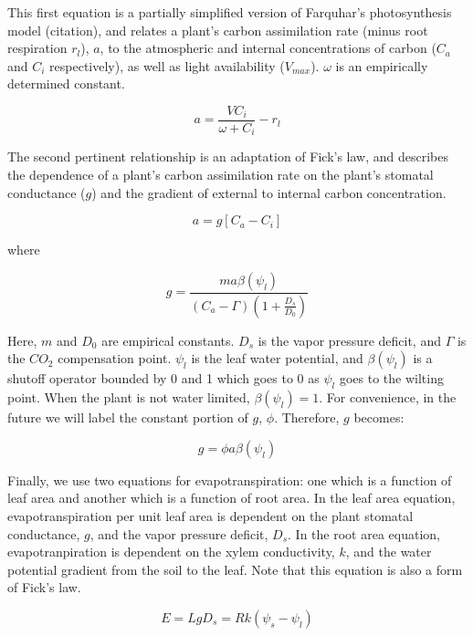 \documentclass{article}
\begin{document}
  This first equation is a partially simplified version of Farquhar's photosynthesis model
  (citation), and relates a plant's carbon assimilation rate (minus root respiration $r_{l}$), $a$, to the atmospheric and internal concentrations of
  carbon ($C_{a}$ and $C_{i}$ respectively), as well as light availability
  ($V_{max}$). $\omega$ is an empirically determined constant.


  \begin{equation} \label{eq:Farquhar}
    a = \frac{VC_{i}}{\omega + C_{i}} - r_{l}
  \end{equation}

  The second pertinent relationship is an adaptation of Fick's law, and
  describes the dependence of a plant's carbon assimilation rate on the
  plant's stomatal conductance ($g$) and the gradient of external to
  internal carbon concentration.

  \begin{equation} \label{eq:Fick's Law}
    a = g[C_{a} - C_{i}]
  \end{equation}

  where

  $$g = \frac{m a \beta(\psi_{l})}{(C_{a} - \Gamma)(1 + \frac{D_{s}}{D_{0}})}$$

  Here, $m$ and $D_{0}$ are empirical constants. $D_{s}$ is the vapor pressure
  deficit, and $\Gamma$ is the $CO_{2}$ compensation point. $\psi_{l}$ is the leaf
  water potential, and $\beta(\psi_{l})$ is a shutoff operator bounded by 0 and
  1 which goes to 0 as $\psi_{l}$ goes to the wilting point. When the plant is
  not water limited, $\beta(\psi_{l}) = 1$. For convenience, in the future we
  will label the constant portion of $g$, $\phi$. Therefore, $g$ becomes:

  $$g = \phi a \beta(\psi_{l})$$

  Finally, we use two equations for evapotranspiration: one which is a function
  of leaf area and another which is a function of root area. In the leaf
  area equation, evapotranspiration per unit leaf area is dependent on the plant
  stomatal conductance, $g$, and the vapor pressure deficit, $D_{s}$. In the
  root area equation, evapotranpiration is dependent on the xylem
  conductivity, $k$, and the water potential gradient from the soil to the leaf.
  Note that this equation is also a form of Fick's law.

  \begin{equation} \label{eq:Evapotranspiration}
    E = LgD_{s} = Rk(\psi_{s} - \psi_{l})
  \end{equation}
\end{document}
